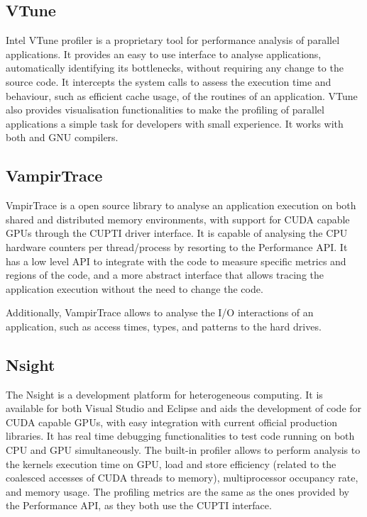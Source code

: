 \subsection*{VTune}

Intel VTune profiler \cite{Intel:VTune} is a proprietary tool for performance analysis of parallel applications. It provides an easy to use interface to analyse applications, automatically identifying its bottlenecks, without requiring any change to the source code. It intercepts the system calls to assess the execution time and behaviour, such as efficient cache usage, of the routines of an application. VTune also provides visualisation functionalities to make the profiling of parallel applications a simple task for developers with small experience. It works with both \intel and GNU compilers.

\subsection*{VampirTrace}

VmpirTrace \cite{VampirTrace} is a open source library to analyse an application execution on both shared and distributed memory environments, with support for CUDA capable GPUs through the CUPTI driver interface. It is capable of analysing the CPU hardware counters per thread/process by resorting to the Performance API. It has a low level API to integrate with the code to measure specific metrics and regions of the code, and a more abstract interface that allows tracing the application execution without the need to change the code.

Additionally, VampirTrace allows to analyse the I/O interactions of an application, such as access times, types, and patterns to the hard drives.

\subsection*{\nvidia Nsight}

The \nvidia Nsight \cite{NVIDIA:Nsight} is a development platform for heterogeneous computing. It is available for both Visual Studio and Eclipse and aids the development of code for CUDA capable GPUs, with easy integration with current official production libraries. It has real time debugging functionalities to test code running on both CPU and GPU simultaneously. The built-in profiler allows to perform analysis to the kernels execution time on GPU, load and store efficiency (related to the coalesced accesses of CUDA threads to memory), multiprocessor occupancy rate, and memory usage. The profiling metrics are the same as the ones provided by the Performance API, as they both use the \nvidia CUPTI interface.
